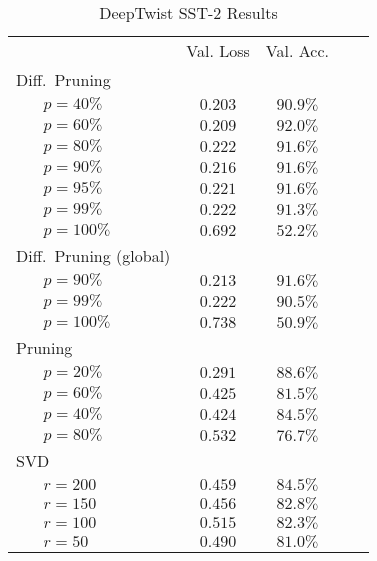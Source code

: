 \newlength{\tableblocksep}
\setlength{\tableblocksep}{1ex}

\begin{table}[tbh]
        \caption{DeepTwist SST-2 Results}
        \label{tab:deeptwistresults}
        \centering
        \vspace{1em}
        \begin{tabular}{p{1ex}lcccc}
\toprule
& &       Val. Loss & Val. Acc. \\
\cmidrule{3-4}
\multicolumn{2}{l}{Diff.\ Pruning} \\
& $p=40\%$  & $0.203$ & $90.9\%$ \\
& $p=60\%$  & $0.209$ & $92.0\%$ \\
& $p=80\%$  & $0.222$ & $91.6\%$ \\
& $p=90\%$  & $0.216$ & $91.6\%$ \\
& $p=95\%$  & $0.221$ & $91.6\%$ \\
& $p=99\%$  & $0.222$ & $91.3\%$ \\
& $p=100\%$ & $0.692$ & $52.2\%$ \\[\tableblocksep]
\multicolumn{2}{l}{Diff.\ Pruning (global)} \\
& $p=90\%$  & $0.213$ & $91.6\%$ \\
& $p=99\%$  & $0.222$ & $90.5\%$ \\
& $p=100\%$ & $0.738$ & $50.9\%$ \\[\tableblocksep]
\multicolumn{2}{l}{Pruning} \\
& $p=20\%$  & $0.291$ & $88.6\%$ \\
& $p=60\%$  & $0.425$ & $81.5\%$ \\
& $p=40\%$  & $0.424$ & $84.5\%$ \\
& $p=80\%$  & $0.532$ & $76.7\%$ \\[\tableblocksep]
\multicolumn{2}{l}{SVD} \\
& $r=200$   & $0.459$ & $84.5\%$ \\
& $r=150$   & $0.456$ & $82.8\%$ \\
& $r=100$   & $0.515$ & $82.3\%$ \\
& $r=50$    & $0.490$ & $81.0\%$ \\[\tableblocksep]
\bottomrule
\end{tabular}

        \end{table}
